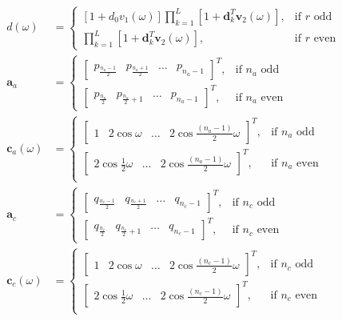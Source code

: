 \documentclass[a4paper,twoside,10pt,english]{report}
\begin{document}
\begin{align*}
d\left(\omega\right) &= \begin{cases}
\left[1 + d_{0}v_{1}\left(\omega\right)\right]
\prod^{L}_{k=1}\left[1 + \boldsymbol{d}_{k}^{T}
\boldsymbol{v}_{2}\left(\omega\right)\right],&\text{if $r$ odd} \\
\prod^{L}_{k=1}\left[1 + \boldsymbol{d}_{k}^{T}
\boldsymbol{v}_{2}\left(\omega\right)\right],&\text{if $r$ even}
\end{cases}\\
\boldsymbol{a}_{a}&=\begin{cases}
\left[ \begin{array}{cccc}
p_{\frac{n_{a}-1}{2}} & p_{\frac{n_{a}+1}{2}} & \hdots & p_{n_{a}-1}
\end{array}\right]^{T}, &  \text{if $n_{a}$ odd} \\
\left[ \begin{array}{cccc}
p_{\frac{n_{a}}{2}} & p_{\frac{n_{a}}{2}+1} & \hdots & p_{n_{a}-1}
\end{array}\right]^{T}, &  \text{if $n_{a}$ even} 
\end{cases}\\
\boldsymbol{c}_{a}\left(\omega\right) &= \begin{cases}
\left[\begin{array}{cccc}
1 & 2 \cos \omega & \hdots & 2 \cos \frac{\left(n_{a}-1\right)}{2}\omega
\end{array}\right]^{T}, &  \text{if $n_{a}$ odd} \\
\left[\begin{array}{ccc}
2 \cos \frac{1}{2}\omega & \hdots & 2 \cos \frac{\left(n_{a}-1\right)}{2}\omega
\end{array}\right]^{T}, &  \text{if $n_{a}$ even} \\
\end{cases}\\
\boldsymbol{a}_{c}&=\begin{cases}
\left[ \begin{array}{cccc}
q_{\frac{n_{c}-1}{2}} & q_{\frac{n_{c}+1}{2}} & \hdots & q_{n_{c}-1}
\end{array}\right]^{T}, &  \text{if $n_{c}$ odd} \\
\left[ \begin{array}{cccc}
q_{\frac{n_{c}}{2}} & q_{\frac{n_{c}}{2}+1} & \hdots & q_{n_{c}-1}
\end{array}\right]^{T}, &  \text{if $n_{c}$ even} 
\end{cases}\\
\boldsymbol{c}_{c}\left(\omega\right) &= \begin{cases}
\left[\begin{array}{cccc}
1 & 2 \cos \omega & \hdots & 2 \cos \frac{\left(n_{c}-1\right)}{2}\omega
\end{array}\right]^{T}, &  \text{if $n_{c}$ odd} \\
\left[\begin{array}{ccc}
2 \cos \frac{1}{2}\omega & \hdots & 2 \cos \frac{\left(n_{c}-1\right)}{2}\omega
\end{array}\right]^{T}, &  \text{if $n_{c}$ even} \\
\end{cases}
\end{align*}
\end{document}
